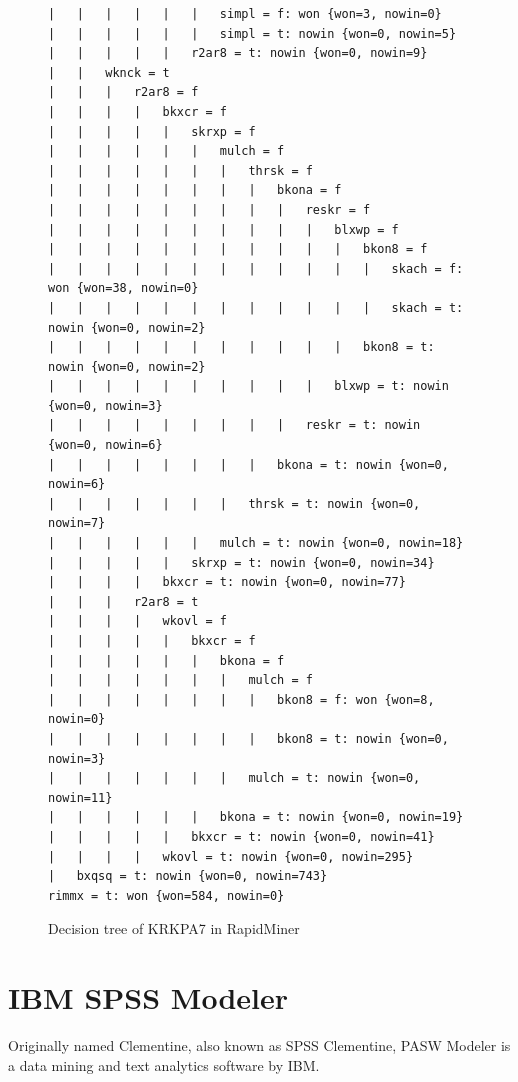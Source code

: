 \documentclass[11pt]{article}
\begin{document}
\begin{figure}[!ht]
\begin{verbatim}
|   |   |   |   |   |   simpl = f: won {won=3, nowin=0}
|   |   |   |   |   |   simpl = t: nowin {won=0, nowin=5}
|   |   |   |   |   r2ar8 = t: nowin {won=0, nowin=9}
|   |   wknck = t
|   |   |   r2ar8 = f
|   |   |   |   bkxcr = f
|   |   |   |   |   skrxp = f
|   |   |   |   |   |   mulch = f
|   |   |   |   |   |   |   thrsk = f
|   |   |   |   |   |   |   |   bkona = f
|   |   |   |   |   |   |   |   |   reskr = f
|   |   |   |   |   |   |   |   |   |   blxwp = f
|   |   |   |   |   |   |   |   |   |   |   bkon8 = f
|   |   |   |   |   |   |   |   |   |   |   |   skach = f: won {won=38, nowin=0}
|   |   |   |   |   |   |   |   |   |   |   |   skach = t: nowin {won=0, nowin=2}
|   |   |   |   |   |   |   |   |   |   |   bkon8 = t: nowin {won=0, nowin=2}
|   |   |   |   |   |   |   |   |   |   blxwp = t: nowin {won=0, nowin=3}
|   |   |   |   |   |   |   |   |   reskr = t: nowin {won=0, nowin=6}
|   |   |   |   |   |   |   |   bkona = t: nowin {won=0, nowin=6}
|   |   |   |   |   |   |   thrsk = t: nowin {won=0, nowin=7}
|   |   |   |   |   |   mulch = t: nowin {won=0, nowin=18}
|   |   |   |   |   skrxp = t: nowin {won=0, nowin=34}
|   |   |   |   bkxcr = t: nowin {won=0, nowin=77}
|   |   |   r2ar8 = t
|   |   |   |   wkovl = f
|   |   |   |   |   bkxcr = f
|   |   |   |   |   |   bkona = f
|   |   |   |   |   |   |   mulch = f
|   |   |   |   |   |   |   |   bkon8 = f: won {won=8, nowin=0}
|   |   |   |   |   |   |   |   bkon8 = t: nowin {won=0, nowin=3}
|   |   |   |   |   |   |   mulch = t: nowin {won=0, nowin=11}
|   |   |   |   |   |   bkona = t: nowin {won=0, nowin=19}
|   |   |   |   |   bkxcr = t: nowin {won=0, nowin=41}
|   |   |   |   wkovl = t: nowin {won=0, nowin=295}
|   bxqsq = t: nowin {won=0, nowin=743}
rimmx = t: won {won=584, nowin=0}
\end{verbatim}
\caption{Decision tree of KRKPA7 in RapidMiner}
\end{figure}


\clearpage


\section{IBM SPSS Modeler}
Originally named Clementine, also known as SPSS Clementine, PASW Modeler is a
data mining and text analytics software by IBM.
\end{document}
